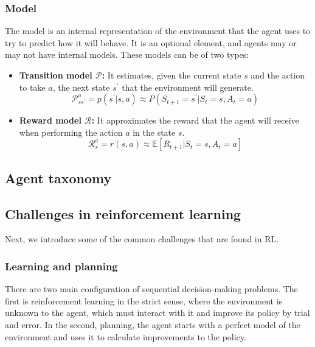 \subsubsection*{Model}

The model is an internal representation of the environment that the agent uses to try to predict how it will behave. It is an optional element, and agents may or may not have internal models. These models can be of two types:

\begin{itemize}
    \item \textbf{Transition model $\mathcal{P}$:} It estimates, given the current state $s$ and the action to take $a$, the next state $s^\prime$ that the environment will generate.
    \begin{equation}
        \mathcal{P}^a_{ss^\prime} = p(s^\prime|s,a) \approx P(S_{t+1} = s^\prime|S_t = s, A_t = a)
    \end{equation}
    \item \textbf{Reward model $\mathcal{R}$:} It approximates the reward that the agent will receive when performing the action $a$ in the state $s$.
    \begin{equation}
        \mathcal{R}^a_s = r(s,a) \approx \mathbb{E}[R_{t+1}| S_t = s, A_t = a]
    \end{equation}
\end{itemize}

\subsection{Agent taxonomy}


\subsection{Challenges in reinforcement learning}
\label{sec:challenges}

Next, we introduce some of the common challenges that are found in RL.

\subsubsection*{Learning and planning}

There are two main configuration of sequential decision-making problems. The first is reinforcement learning in the strict sense, where the environment is unknown to the agent, which must interact with it and improve its policy by trial and error. In the second, planning, the agent starts with a perfect model of the environment and uses it to calculate improvements to the policy.

